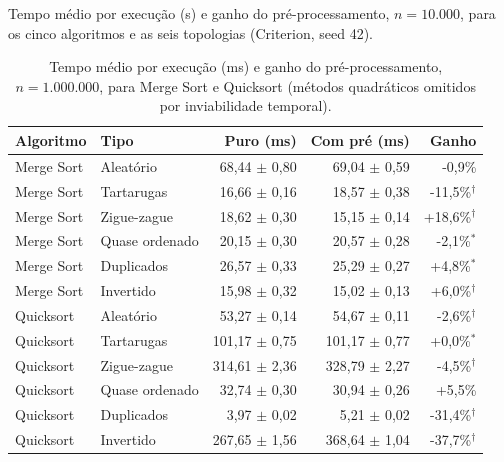 \documentclass[12pt]{article}
\newcommand{\tabajustada}[1]{{\setlength{\tabcolsep}{3pt}%
  \let\footnotesize\scriptsize
  \begin{adjustbox}{max width=\textwidth}\end{adjustbox}}}
\begin{document}
\begingroup
\renewcommand{\arraystretch}{0.9}

\begin{table}[H]
\raggedbottom
\centering
\caption{Tempo médio por execução (\textmu{}s) e ganho do pré-processamento, $n=10.000$, para os cinco algoritmos e as seis topologias (Criterion, seed 42).}
\label{tab:apA}
\tabajustada{resultados/tab4_pt_tabular}
\end{table}

\begin{table}[H]
\raggedbottom
\centering
\caption{Tempo médio por execução (ms) e ganho do pré-processamento, $n=1.000.000$, para Merge Sort e Quicksort (métodos quadráticos omitidos por inviabilidade temporal).}
\label{tab:apB}
\footnotesize
\begin{tabular}{llrrr}
\hline
\textbf{Algoritmo} & \textbf{Tipo} & \textbf{Puro (ms)} & \textbf{Com pré (ms)} & \textbf{Ganho} \\
\hline
Merge Sort & Aleatório & 68,44 $\pm$ 0,80 & 69,04 $\pm$ 0,59 & -0,9\% \\
Merge Sort & Tartarugas & 16,66 $\pm$ 0,16 & 18,57 $\pm$ 0,38 & -11,5\%$^{\dagger}$ \\
Merge Sort & Zigue-zague & 18,62 $\pm$ 0,30 & 15,15 $\pm$ 0,14 & +18,6\%$^{\dagger}$ \\
Merge Sort & Quase ordenado & 20,15 $\pm$ 0,30 & 20,57 $\pm$ 0,28 & -2,1\%$^{*}$ \\
Merge Sort & Duplicados & 26,57 $\pm$ 0,33 & 25,29 $\pm$ 0,27 & +4,8\%$^{*}$ \\
Merge Sort & Invertido & 15,98 $\pm$ 0,32 & 15,02 $\pm$ 0,13 & +6,0\%$^{\dagger}$ \\
Quicksort & Aleatório & 53,27 $\pm$ 0,14 & 54,67 $\pm$ 0,11 & -2,6\%$^{\dagger}$ \\
Quicksort & Tartarugas & 101,17 $\pm$ 0,75 & 101,17 $\pm$ 0,77 & +0,0\%$^{*}$ \\
Quicksort & Zigue-zague & 314,61 $\pm$ 2,36 & 328,79 $\pm$ 2,27 & -4,5\%$^{\dagger}$ \\
Quicksort & Quase ordenado & 32,74 $\pm$ 0,30 & 30,94 $\pm$ 0,26 & +5,5\% \\
Quicksort & Duplicados & 3,97 $\pm$ 0,02 & 5,21 $\pm$ 0,02 & -31,4\%$^{\dagger}$ \\
Quicksort & Invertido & 267,65 $\pm$ 1,56 & 368,64 $\pm$ 1,04 & -37,7\%$^{\dagger}$ \\
\hline
\end{tabular}
\end{table}

\endgroup

\clearpage


\end{document}
